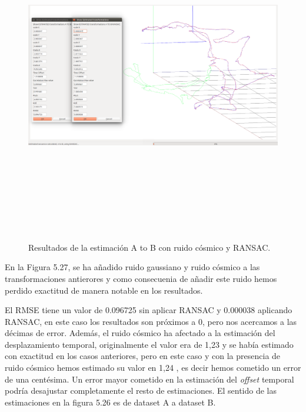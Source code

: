 \begin{figure}[H]
\begin{center}
\label{fig:opciones de View}\includegraphics[height=14.0cm,width=18.0cm]{img/cap6/newData_EscalaTraslaRotaGaussCosmic_ab.png}
\hspace{0.5cm}
\end{center}

\caption{Resultados de la estimación A to B con ruido cósmico y RANSAC.}
\end{figure}
En la Figura 5.27, se ha añadido ruido gaussiano y ruido cósmico a las transformaciones antierores y como consecuenia de añadir este ruido hemos perdido exactitud de manera notable en los resultados. 

El RMSE tiene un valor de 0.096725 sin aplicar RANSAC y 0.000038 aplicando RANSAC, en este caso los resultados son próximos a 0, pero nos acercamos a las décimas de error.
Además, el ruido cósmico ha afectado a la estimación del desplazamiento temporal, originalmente el valor era de 1,23 y se había estimado con exactitud en los casos anteriores, pero en este caso y con la presencia de ruido cósmico hemos estimado su valor en 1,24 , es decir hemos cometido un error de una centésima. Un error mayor cometido en la estimación del \textit{offset} temporal podría desajustar completamente el resto de estimaciones.
El sentido de las estimaciones en la figura 5.26 es de dataset A a dataset B.


